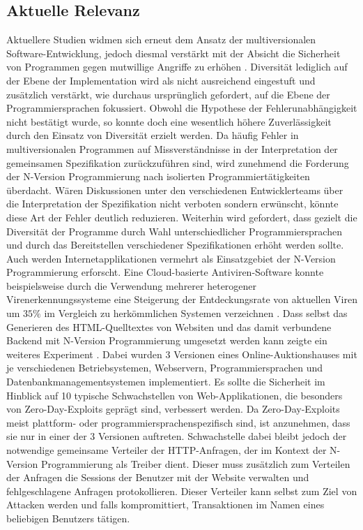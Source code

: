 \subsection{Aktuelle Relevanz}\label{bewertung-relevanz}
Aktuellere Studien widmen sich erneut dem Ansatz der multiversionalen Software-Entwicklung, jedoch diesmal verstärkt mit der Absicht die Sicherheit von Programmen gegen mutwillige Angriffe zu erhöhen \cite{current-challenges}. Diversität lediglich auf der Ebene der Implementation wird als nicht ausreichend eingestuft und zusätzlich verstärkt, wie durchaus ursprünglich gefordert, auf die Ebene der Programmiersprachen fokussiert. Obwohl die Hypothese der Fehlerunabhängigkeit nicht bestätigt wurde, so konnte doch eine wesentlich höhere Zuverlässigkeit durch den Einsatz von Diversität erzielt werden.
Da häufig Fehler in multiversionalen Programmen auf Missverständnisse in der Interpretation der gemeinsamen Spezifikation zurückzuführen sind, wird zunehmend die Forderung der N-Version Programmierung nach isolierten Programmiertätigkeiten überdacht. Wären Diskussionen unter den verschiedenen Entwicklerteams über die Interpretation der Spezifikation nicht verboten sondern erwünscht, könnte diese Art der Fehler deutlich reduzieren. Weiterhin wird gefordert, dass gezielt die Diversität der Programme durch Wahl unterschiedlicher Programmiersprachen und durch das Bereitstellen verschiedener Spezifikationen erhöht werden sollte. 
Auch werden Internetapplikationen vermehrt als Einsatzgebiet der N-Version Programmierung erforscht. Eine Cloud-basierte Antiviren-Software konnte beispielsweise durch die Verwendung mehrerer heterogener Virenerkennungssysteme eine Steigerung der Entdeckungsrate von aktuellen Viren um $35\%$ im Vergleich zu herkömmlichen Systemen verzeichnen \cite{Oberheide:2008:CNA:1496711.1496718}. Dass selbst das Generieren des HTML-Quelltextes von Websiten und das damit verbundene Backend mit N-Version Programmierung umgesetzt werden kann zeigte ein weiteres Experiment \cite{zero-day}. 
Dabei wurden 3 Versionen eines Online-Auktionshauses mit je verschiedenen Betriebsystemen, Webservern, Programmiersprachen und Datenbankmanagementsystemen implementiert. Es sollte die Sicherheit im Hinblick auf 10 typische Schwachstellen von Web-Applikationen, die besonders von Zero-Day-Exploits geprägt sind, verbessert werden. Da Zero-Day-Exploits meist plattform- oder programmiersprachenspezifisch sind, ist anzunehmen, dass sie nur in einer der 3 Versionen auftreten. Schwachstelle dabei bleibt jedoch der notwendige gemeinsame Verteiler der HTTP-Anfragen, der im Kontext der N-Version Programmierung als Treiber dient. Dieser muss zusätzlich zum Verteilen der Anfragen die Sessions der Benutzer mit der Website verwalten und fehlgeschlagene Anfragen protokollieren.
Dieser Verteiler kann selbst zum Ziel von Attacken werden und falls kompromittiert, Transaktionen im Namen eines beliebigen Benutzers tätigen.